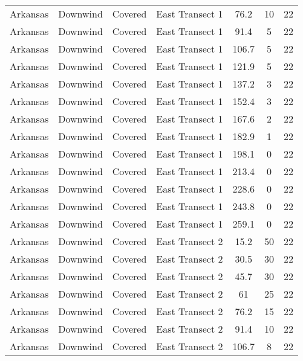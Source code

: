 \documentclass{article}
\begin{document}
\begin{longtable}[c]{ccccccc}
Arkansas  & Downwind  & Covered     & East Transect 1 & 76.2         & 10          & 22  \\
Arkansas  & Downwind  & Covered     & East Transect 1 & 91.4         & 5           & 22  \\
Arkansas  & Downwind  & Covered     & East Transect 1 & 106.7        & 5           & 22  \\
Arkansas  & Downwind  & Covered     & East Transect 1 & 121.9        & 5           & 22  \\
Arkansas  & Downwind  & Covered     & East Transect 1 & 137.2        & 3           & 22  \\
Arkansas  & Downwind  & Covered     & East Transect 1 & 152.4        & 3           & 22  \\
Arkansas  & Downwind  & Covered     & East Transect 1 & 167.6        & 2           & 22  \\
Arkansas  & Downwind  & Covered     & East Transect 1 & 182.9        & 1           & 22  \\
Arkansas  & Downwind  & Covered     & East Transect 1 & 198.1        & 0           & 22  \\
Arkansas  & Downwind  & Covered     & East Transect 1 & 213.4        & 0           & 22  \\
Arkansas  & Downwind  & Covered     & East Transect 1 & 228.6        & 0           & 22  \\
Arkansas  & Downwind  & Covered     & East Transect 1 & 243.8        & 0           & 22  \\
Arkansas  & Downwind  & Covered     & East Transect 1 & 259.1        & 0           & 22  \\
Arkansas  & Downwind  & Covered     & East Transect 2 & 15.2         & 50          & 22  \\
Arkansas  & Downwind  & Covered     & East Transect 2 & 30.5         & 30          & 22  \\
Arkansas  & Downwind  & Covered     & East Transect 2 & 45.7         & 30          & 22  \\
Arkansas  & Downwind  & Covered     & East Transect 2 & 61           & 25          & 22  \\
Arkansas  & Downwind  & Covered     & East Transect 2 & 76.2         & 15          & 22  \\
Arkansas  & Downwind  & Covered     & East Transect 2 & 91.4         & 10          & 22  \\
Arkansas  & Downwind  & Covered     & East Transect 2 & 106.7        & 8           & 22  \\

\end{longtable}
\end{document}
